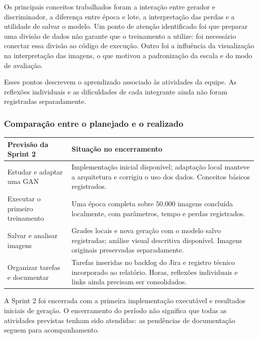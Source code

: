\documentclass[12pt,a4paper]{article}
\begin{document}
Os principais conceitos trabalhados foram a interação entre gerador e discriminador, a diferença entre época e lote, a interpretação das perdas e a utilidade de salvar o modelo. Um ponto de atenção identificado foi que preparar uma divisão de dados não garante que o treinamento a utilize: foi necessário conectar essa divisão ao código de execução. Outro foi a influência da visualização na interpretação das imagens, o que motivou a padronização da escala e do modo de avaliação.

Esses pontos descrevem o aprendizado associado às atividades da equipe. As reflexões individuais e as dificuldades de cada integrante ainda não foram registradas separadamente.

\subsubsection{Comparação entre o planejado e o realizado}
\begin{center}
\small
\begin{tabularx}{\textwidth}{@{}>{\raggedright\arraybackslash}p{}Y@{}}
\toprule
\textbf{Previsão da Sprint 2} & \textbf{Situação no encerramento} \\
\midrule
Estudar e adaptar uma GAN & Implementação inicial disponível; adaptação local manteve a arquitetura e corrigiu o uso dos dados. Conceitos básicos registrados. \\
Executar o primeiro treinamento & Uma época completa sobre 50.000 imagens concluída localmente, com parâmetros, tempo e perdas registrados. \\
Salvar e analisar imagens & Grades locais e nova geração com o modelo salvo registradas; análise visual descritiva disponível. Imagens originais preservadas separadamente. \\
Organizar tarefas e documentar & Tarefas inseridas no backlog do Jira e registro técnico incorporado ao relatório. Horas, reflexões individuais e links ainda precisam ser consolidados. \\
\bottomrule
\end{tabularx}
\end{center}

A Sprint 2 foi encerrada com a primeira implementação executável e resultados iniciais de geração. O encerramento do período não significa que todas as atividades previstas tenham sido atendidas: as pendências de documentação seguem para acompanhamento.
\end{document}
